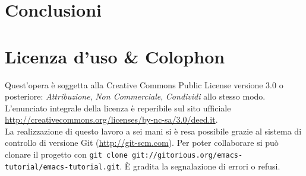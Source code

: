 \documentclass[11pt,a4paper]{article}
\begin{document}

\section{Conclusioni}
\label{sec:fine}

\textcolor{red}{\lipsum[1]}

\clearpage
{}
{}
\nocite{*}
\printbibliography

\vfill
{}
{}
\section*{Licenza d'uso \& Colophon}
\label{sec:lic}

Quest'opera è soggetta alla Creative Commons Public License versione 3.0 o
posteriore: \emph{Attribuzione}, \emph{Non Commerciale}, \emph{Condividi} allo
stesso modo. L'enunciato integrale della licenza è reperibile sul sito ufficiale
\url{http://creativecommons.org/licenses/by-nc-sa/3.0/deed.it}.\\%

\noindent La realizzazione di questo lavoro a sei mani si è resa possibile
grazie al sistema di controllo di versione Git (\url{http://git-scm.com}). Per
poter collaborare si può clonare il progetto con %
\verb!git clone git://gitorious.org/emacs-tutorial/emacs-tutorial.git!. È
gradita la segnalazione di errori o refusi.
\end{document}
